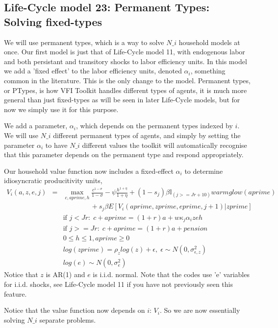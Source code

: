 \subsection{Life-Cycle model 23: Permanent Types: Solving fixed-types}
We will use permanent types, which is a way to solve $N\_{}i$ household models at once. Our first model is just that of Life-Cycle model 11, with endogenous labor and both persistant and transitory shocks to labor efficiency units. In this model we add a 'fixed effect' to the labor efficiency units, denoted $\alpha_i$, something common in the literature. This is the only change to the model. Permanent types, or PTypes, is how VFI Toolkit handles different types of agents, it is much more general than just fixed-types as will be seen in later Life-Cycle models, but for now we simply use it for this purpose.

We add a parameter, $\alpha_i$, which depends on the permanent types indexed by $i$. We will use $N\_{}i$ different permanent types of agents, and simply by setting the parameter $\alpha_i$ to have $N\_{}i$ different values the toolkit will automatically recognise that this parameter depends on the permanent type and respond appropriately.

Our household value function now includes a fixed-effect $\alpha_i$ to determine idiosyncratic producitivity units,
\begin{eqnarray*}
 V_i(a,z,e,j)&=& \max_{c,aprime,h} \frac{c^{1-\sigma}}{1-\sigma} - \psi \frac{h^{1+\eta}}{1+\eta} + (1-s_j)\beta  \mathbb{I}_{(j>=Jr+10)} warmglow(aprime)    \\
 && \quad \quad  \quad \quad  + s_j \beta E[V_i(aprime,zprime,eprime,j+1)|zprime] \\
&& \text{if }j<Jr: \; c+aprime=(1+r)a+w \kappa_j \alpha_i z e h \\
&& \text{if }j>=Jr: \; c+aprime=(1+r)a +pension\\
&& 0\leq h \leq 1, aprime\geq 0 \\
&& log(zprime)=\rho_{z} log(z) + \epsilon, \; \epsilon \sim N(0,\sigma_{\epsilon,z}^2) \\
&& log(e) \sim N(0,\sigma_{e}^2)
\end{eqnarray*}
Notice that $z$ is AR(1) and $e$ is i.i.d. normal. Note that the codes use 'e' variables for i.i.d. shocks, see Life-Cycle model 11 if you have not previously seen this feature. 

Notice that the value function now depends on $i$: $V_i$. So we are now essentially solving $N\_{}i$ separate problems.

